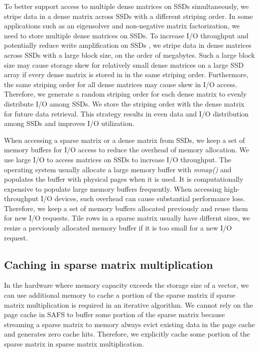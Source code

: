 To better support access to multiple dense matrices on SSDs simultaneously, we
stripe data in a dense matrix across SSDs with a different striping order.
In some applications such as an eigensolver and non-negative matrix factorization,
we need to store multiple dense matrices on SSDs. To increase I/O throughput and
potentially reduce write amplification on SSDs \cite{Tang15}, we stripe data
in dense matrices across SSDs with a large block size, on the order of megabytes.
Such a large block size may cause storage skew for relatively small dense matrices
on a large SSD array if every dense matrix is stored in in the same striping order.
Furthermore, the same striping order for all dense matrices may cause skew in
I/O access. Therefore, we generate a random striping order for each dense
matrix to evenly distribute I/O among SSDs. We store the striping order
with the dense matrix for future data retrieval. This strategy results in even
data and I/O distribution among SSDs and improves I/O utilization. 

When accessing a sparse matrix or a dense matrix from SSDs, we keep a set of
memory buffers for I/O access to reduce the overhead of memory allocation.
We use large I/O to access matrices on SSDs to increase I/O throughput.
The operating system usually allocate a large memory buffer with \textit{mmap()}
and populates the buffer with physical pages when it is used. It is
computationally expensive to populate
large memory buffers frequently. When accessing high-throughput I/O devices,
such overhead can cause substantial performance loss. Therefore, we keep a set
of memory buffers allocated previously and reuse them for new I/O requests.
Tile rows in a sparse matrix usually have differnt sizes, we resize a previously
allocated memory buffer if it is too small for a new I/O request.

\subsection{Caching in sparse matrix multiplication} \label{sec:cache}
In the hardware where memory capacity exceeds the storage size of a vector, we
can use additional memory to cache a portion of the sparse matrix if sparse matrix
multiplication is required in an iterative algorithm. We cannot rely on
the page cache in SAFS \cite{sa-cache} to buffer some portion of the sparse matrix
because streaming a sparse matrix to memory always evict existing data in the page
cache and generates zero cache hits. Therefore, we explicitly cache some portion
of the sparse matrix in sparse matrix multiplication. 

